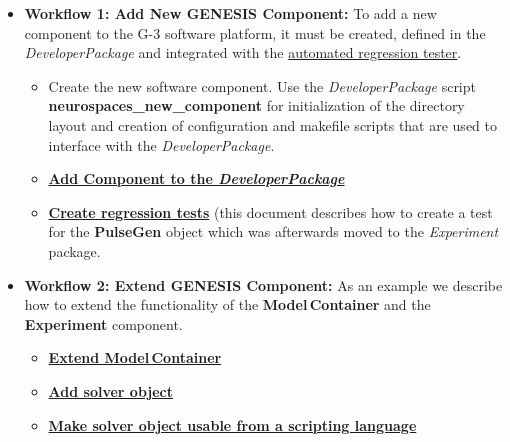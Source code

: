 \documentclass[12pt]{article}
\begin{document}
\begin{itemize}
\item[]{\bf Workflow 1: Add New GENESIS Component:} To add a new
  component to the G-3 software platform, it must be created, defined
  in the {\it DeveloperPackage} and integrated with the
  \href{../neurospaces-tester/neurospaces-tester.tex}{automated
    regression tester}.
  \begin{itemize}
  \item[]Create the new software component.  Use the {\it
      DeveloperPackage} script {\bf neurospaces\_new\_component} for
    initialization of the directory layout and creation of
    configuration and makefile scripts that are used to interface with
    the {\it DeveloperPackage}.
  \item[]\href{../genesis-addto-component-developerpackage/genesis-addto-component-developerpackage.tex}{\bf
      Add Component to the {\it DeveloperPackage}}
  \item[]\href{../genesis-create-test-heccer/genesis-create-test-heccer.tex}{\bf
      Create regression tests} (this document describes how to create
    a test for the {\bf PulseGen} object which was afterwards moved to
    the {\it Experiment} package.
  \end{itemize}
  
\item[]{\bf Workflow 2: Extend GENESIS Component:} As an example we
  describe how to extend the functionality of the {\bf
    Model\,Container} and the {\bf Experiment} component.
  \begin{itemize}
  \item[]\href{../genesis-extend-model-container/genesis-extend-model-container.tex}{\bf Extend Model\,Container}
  \item[]\href{../genesis-add-object-solver/genesis-add-object-solver.tex}{\bf Add solver object}
  \item[]\href{../genesis-add-swigbinding-heccer/genesis-add-swigbinding-heccer.tex}{\bf Make solver object usable from a scripting language}
  \end{itemize}
  
\end{itemize}
\end{document}
